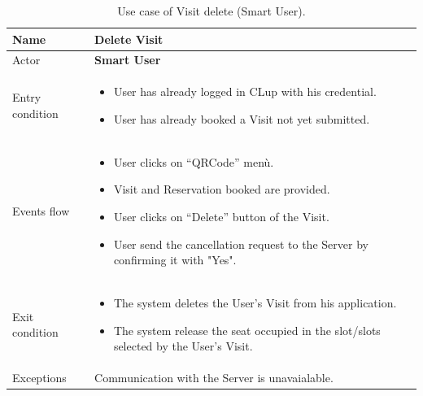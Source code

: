 \begin{table}[H]\begin{tabular}{|p{5cm} | p{7cm} | }
	\hline
	Name & \textbf{Delete Visit} \\
	\hline
	Actor & \textbf{Smart User} \\
	\hline
	Entry condition &
	\begin{itemize}
		\item User has already logged in CLup with his credential. 
		\item User has already booked a Visit not yet submitted. 
	\end{itemize} \\
	\hline
	Events flow & 
	\begin{itemize}
		\item User clicks on “QRCode” menù.
		\item Visit and Reservation booked are provided.
		\item User clicks on “Delete” button of the Visit.
		\item User send the cancellation request to the Server by confirming it with "Yes".
	\end{itemize} \\
	\hline
	Exit condition &
	\begin{itemize}	
		\item The system deletes the User's Visit from his application.
		\item The system release the seat occupied in the slot/slots selected by the User's Visit.
	\end{itemize} \\
	\hline 
	Exceptions & Communication with the Server is unavaialable. \\ 
	\hline
\end{tabular}
\caption{Use case of Visit delete (Smart User).}

\end{table}

\bigbreak


